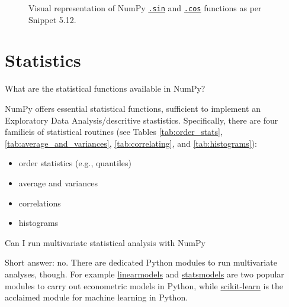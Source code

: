 \documentclass[a4paper,11pt]{book}
\numberwithin{figure}{chapter}
\numberwithin{table}{chapter}
\newcommand{\question}[1]{%
    \begin{tcolorbox}[colback=comp_c!10,colframe=comp_c,sidebyside align=top,width=\linewidth,before skip=1ex]
        #1
    \end{tcolorbox}
    \switchcolumn%
}
\newcommand{\note}[1]{%
    \begin{tcolorbox}[colback=white!0,colframe=white!10,width=\linewidth,before skip=1ex]
        #1
    \end{tcolorbox}
}
\begin{document}
\begin{figure}[!htbp]
	\centering
	
	
	\caption{Visual representation of NumPy \href{https://numpy.org/doc/stable/reference/generated/numpy.sin.html\#numpy.sin}{\texttt{.sin}} and \href{https://numpy.org/doc/stable/reference/generated/numpy.cos.html\#numpy.cos}{\texttt{.cos}} functions as per Snippet 5.12.}
\end{figure}

\section{Statistics}

\begin{paracol}{2}
	\question{\raggedright What are the statistical functions available in NumPy?}
	\note{NumPy offers essential statistical functions, sufficient to implement an Exploratory Data Analysis/descritive stastistics. Specifically, there are four familieis of statistical routines (see Tables \ref{tab:order_stats}, \ref{tab:average_and_variances}, \ref{tab:correlating}, and \ref{tab:histograms}):
	
	\begin{itemize}
		\item order statistics (e.g., quantiles)
		\item average and variances
		\item correlations 
		\item histograms
	\end{itemize}
	}
\end{paracol}

\begin{paracol}{2}
	\question{\raggedright Can I run multivariate statistical analysis with NumPy}
	\note{Short answer: no. There are dedicated Python modules to run multivariate analyses, though. For example \href{https://bashtage.github.io/linearmodels/index.html}{linearmodels} and \href{https://www.statsmodels.org/stable/generated/statsmodels.sandbox.regression.gmm.IV2SLS.html?highlight=2sls#statsmodels.sandbox.regression.gmm.IV2SLS}{statsmodels} are two popular modules to carry out econometric models in Python, while \href{https://scikit-learn.org/stable/}{scikit-learn} is the acclaimed module for machine learning in Python.}
\end{paracol}
\clearpage
\end{document}
